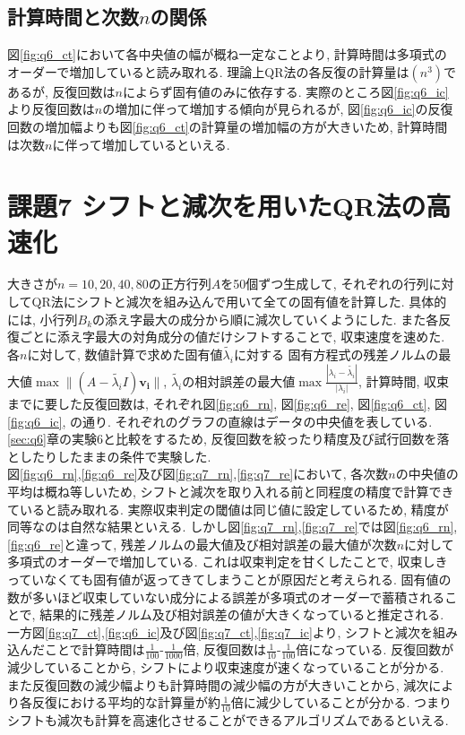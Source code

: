 \documentclass[uplatex,a4j]{jsarticle}
\begin{document}
\subsection{計算時間と次数$n$の関係}
\label{sec:q6_3}
図\ref{fig:q6_ct}において各中央値の幅が概ね一定なことより, 
計算時間は多項式のオーダーで増加していると読み取れる. 
理論上QR法の各反復の計算量は$(n^3)$であるが, 反復回数は$n$によらず固有値のみに依存する. 
実際のところ図\ref{fig:q6_ic}より反復回数は$n$の増加に伴って増加する傾向が見られるが, 
図\ref{fig:q6_ic}の反復回数の増加幅よりも図\ref{fig:q6_ct}の計算量の増加幅の方が大きいため, 
計算時間は次数$n$に伴って増加しているといえる. 


\section{課題7 シフトと減次を用いたQR法の高速化}
\label{sec:q7}
大きさが$n = 10,20,40,80$の正方行列$A$を50個ずつ生成して, 
それぞれの行列に対してQR法にシフトと減次を組み込んで用いて全ての固有値を計算した. 
具体的には, 小行列$B_k$の添え字最大の成分から順に減次していくようにした. 
また各反復ごとに添え字最大の対角成分の値だけシフトすることで, 収束速度を速めた. \\
各$n$に対して, 数値計算で求めた固有値$\tilde{\lambda_i}$に対する
固有方程式の残差ノルムの最大値$\max{\| (A - \tilde{\lambda_i}I) \bm{v_i} \| }$, 
$\tilde{\lambda_i}$の相対誤差の最大値$\max{\frac{|\lambda_i - \tilde{\lambda_i}|}{|\lambda_i|}}$, 
計算時間, 収束までに要した反復回数は, 
それぞれ図\ref{fig:q6_rn}, 図\ref{fig:q6_re}, 図\ref{fig:q6_ct}, 図\ref{fig:q6_ic}, の通り. 
それぞれのグラフの直線はデータの中央値を表している. \\
\ref{sec:q6}章の実験6と比較をするため, 
反復回数を絞ったり精度及び試行回数を落としたりしたままの条件で実験した. \\
図\ref{fig:q6_rn},\ref{fig:q6_re}及び図\ref{fig:q7_rn},\ref{fig:q7_re}において, 
各次数$n$の中央値の平均は概ね等しいため, シフトと減次を取り入れる前と同程度の精度で計算できていると読み取れる. 
実際収束判定の閾値は同じ値に設定しているため, 精度が同等なのは自然な結果といえる. 
しかし図\ref{fig:q7_rn},\ref{fig:q7_re}では図\ref{fig:q6_rn},\ref{fig:q6_re}と違って, 
残差ノルムの最大値及び相対誤差の最大値が次数$n$に対して多項式のオーダーで増加している. 
これは収束判定を甘くしたことで, 収束しきっていなくても固有値が返ってきてしまうことが原因だと考えられる. 
固有値の数が多いほど収束していない成分による誤差が多項式のオーダーで蓄積されることで, 
結果的に残差ノルム及び相対誤差の値が大きくなっていると推定される. \\
一方図\ref{fig:q7_ct},\ref{fig:q6_ic}及び図\ref{fig:q7_ct},\ref{fig:q7_ic}より, 
シフトと減次を組み込んだことで計算時間は$\frac{1}{100}$-$\frac{1}{1000}$倍, 
反復回数は$\frac{1}{10}$-$\frac{1}{100}$倍になっている. 
反復回数が減少していることから, シフトにより収束速度が速くなっていることが分かる. 
また反復回数の減少幅よりも計算時間の減少幅の方が大きいことから, 
減次により各反復における平均的な計算量が約$\frac{1}{10}$倍に減少していることが分かる. 
つまりシフトも減次も計算を高速化させることができるアルゴリズムであるといえる. 
\end{document}
